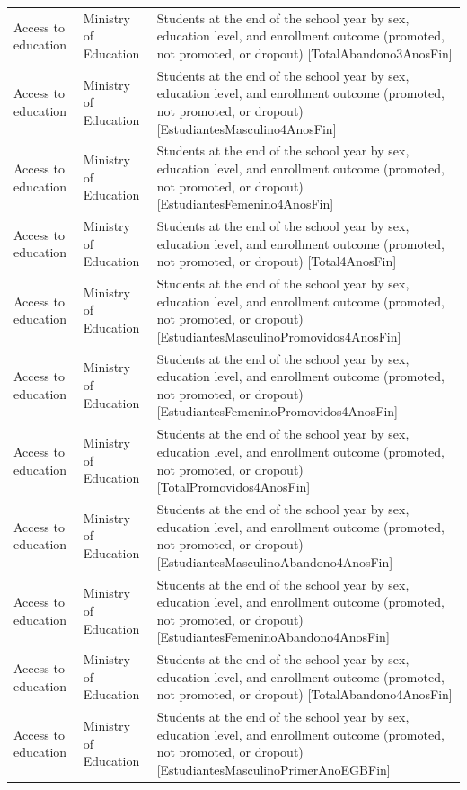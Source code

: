 \documentclass[10pt,a4paper]{article}
\begin{document}
\begin{longtable}{@{}>{\raggedright\arraybackslash}p{3.5cm}>{\raggedright\arraybackslash}p{5.6cm}>{\raggedright\arraybackslash}p{\dimexpr\textwidth-9.1cm-4\tabcolsep\relax}@{}}
Access to education & Ministry of Education & Students at the end of the school year by sex, education level, and enrollment outcome (promoted, not promoted, or dropout) [TotalAbandono3AnosFin]\\
Access to education & Ministry of Education & Students at the end of the school year by sex, education level, and enrollment outcome (promoted, not promoted, or dropout) [EstudiantesMasculino4AnosFin]\\
Access to education & Ministry of Education & Students at the end of the school year by sex, education level, and enrollment outcome (promoted, not promoted, or dropout) [EstudiantesFemenino4AnosFin]\\
Access to education & Ministry of Education & Students at the end of the school year by sex, education level, and enrollment outcome (promoted, not promoted, or dropout) [Total4AnosFin]\\
Access to education & Ministry of Education & Students at the end of the school year by sex, education level, and enrollment outcome (promoted, not promoted, or dropout) [EstudiantesMasculinoPromovidos4AnosFin]\\
Access to education & Ministry of Education & Students at the end of the school year by sex, education level, and enrollment outcome (promoted, not promoted, or dropout) [EstudiantesFemeninoPromovidos4AnosFin]\\
Access to education & Ministry of Education & Students at the end of the school year by sex, education level, and enrollment outcome (promoted, not promoted, or dropout) [TotalPromovidos4AnosFin]\\
Access to education & Ministry of Education & Students at the end of the school year by sex, education level, and enrollment outcome (promoted, not promoted, or dropout) [EstudiantesMasculinoAbandono4AnosFin]\\
Access to education & Ministry of Education & Students at the end of the school year by sex, education level, and enrollment outcome (promoted, not promoted, or dropout) [EstudiantesFemeninoAbandono4AnosFin]\\
Access to education & Ministry of Education & Students at the end of the school year by sex, education level, and enrollment outcome (promoted, not promoted, or dropout) [TotalAbandono4AnosFin]\\
Access to education & Ministry of Education & Students at the end of the school year by sex, education level, and enrollment outcome (promoted, not promoted, or dropout) [EstudiantesMasculinoPrimerAnoEGBFin]\\

\end{longtable}
\end{document}
